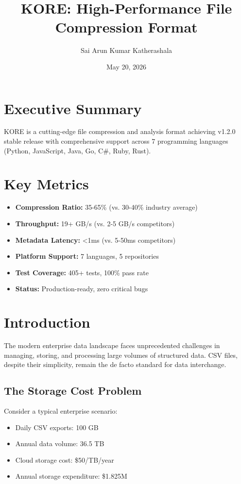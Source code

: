 \documentclass{article}
\title{KORE: High-Performance File Compression Format}
\author{Sai Arun Kumar Katherashala}
\date{May 20, 2026}
\begin{document}
\maketitle

\section*{Executive Summary}

KORE is a cutting-edge file compression and analysis format achieving v1.2.0 stable release with comprehensive support across 7 programming languages (Python, JavaScript, Java, Go, C\#, Ruby, Rust).

\section*{Key Metrics}

\begin{itemize}
    \item \textbf{Compression Ratio:} 35-65\% (vs. 30-40\% industry average)
    \item \textbf{Throughput:} 19+ GB/s (vs. 2-5 GB/s competitors)
    \item \textbf{Metadata Latency:} <1ms (vs. 5-50ms competitors)
    \item \textbf{Platform Support:} 7 languages, 5 repositories
    \item \textbf{Test Coverage:} 405+ tests, 100\% pass rate
    \item \textbf{Status:} Production-ready, zero critical bugs
\end{itemize}

\section*{Introduction}

The modern enterprise data landscape faces unprecedented challenges in managing, storing, and processing large volumes of structured data. CSV files, despite their simplicity, remain the de facto standard for data interchange.

\subsection*{The Storage Cost Problem}

Consider a typical enterprise scenario:
\begin{itemize}
    \item Daily CSV exports: 100 GB
    \item Annual data volume: 36.5 TB
    \item Cloud storage cost: \$50/TB/year
    \item Annual storage expenditure: \$1.825M
\end{itemize}
\end{document}
